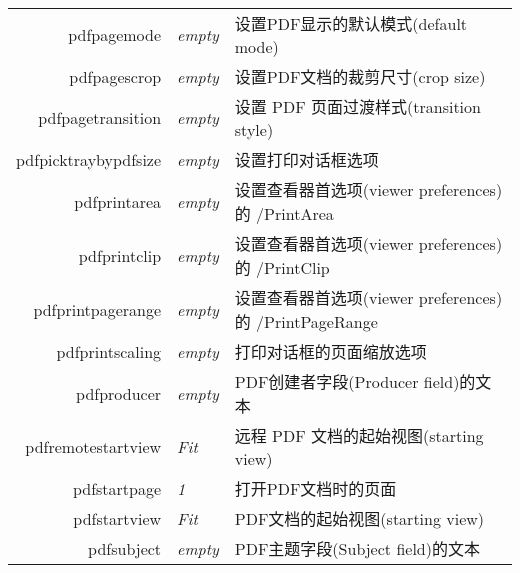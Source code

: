 \documentclass{article}
\begin{document}
\begin{longtable}{@{}>{\ttfamily}rlp{7cm}@{}}
  pdfpagemode                       & \textit{empty}         & 设置PDF显示的默认模式(default mode)                                                                      \\
  pdfpagescrop                      & \textit{empty}         & 设置PDF文档的裁剪尺寸(crop size)                                                                         \\
  pdfpagetransition                 & \textit{empty}         & 设置 PDF 页面过渡样式(transition style)                                                                 \\
  pdfpicktraybypdfsize
                                    & \textit{empty}         & 设置打印对话框选项                                                                                       \\
  pdfprintarea                      & \textit{empty}         & 设置查看器首选项(viewer preferences)的 /PrintArea                                                        \\
  pdfprintclip                      & \textit{empty}         & 设置查看器首选项(viewer preferences)的 /PrintClip                                                        \\
  pdfprintpagerange                 & \textit{empty}         & 设置查看器首选项(viewer preferences)的 /PrintPageRange                                                   \\
  pdfprintscaling                   & \textit{empty}         & 打印对话框的页面缩放选项                                                                                    \\
  pdfproducer                       & \textit{empty}         & PDF创建者字段(Producer field)的文本                                                                     \\
  pdfremotestartview                & \textit{Fit}           & 远程 PDF 文档的起始视图(starting view)                                                                   \\
  pdfstartpage                      & \textit{1}             & 打开PDF文档时的页面                                                                                     \\
  pdfstartview                      & \textit{Fit}           & PDF文档的起始视图(starting view)                                                                       \\
  pdfsubject                        & \textit{empty}         & PDF主题字段(Subject field)的文本                                                                       \\

\end{longtable}
\end{document}

